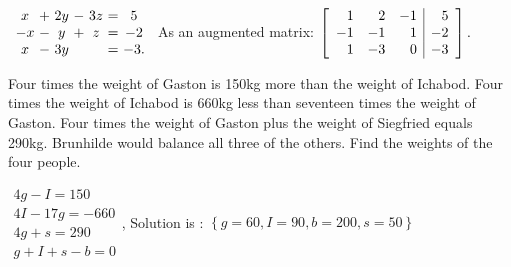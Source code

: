 \begin{enumialphparenastyle}
\begin{ex}
  \begin{sol}
    $
    \begin{array}{c@{~}c@{~}c@{~}c@{~}c@{~}c@{~}c}
      x &+& 2y &-& 3z &=& 5\\
      -x &-& y &+& z &=& -2\\
      x &-& 3y && &=& -3.\\
    \end{array}
    $
    As an augmented matrix:
    $
    \left[
    \begin{array}{rrr|r}
      1 & 2 & -1 & 5\\
      -1 & -1 & 1 & -2\\
      1 & -3 & 0 & -3
    \end{array}
    \right].
    $
  \end{sol}
\end{ex}


\begin{ex}
Four times the weight of Gaston is 150kg more than the weight of
Ichabod. Four times the weight of Ichabod is 660kg less than seventeen
times the weight of Gaston. Four times the weight of Gaston plus the weight
of Siegfried equals 290kg. Brunhilde would balance all three of the
others. Find the weights of the four people.
\begin{sol}
$\begin{array}{c}
4g-I=150 \\
4I-17g=-660 \\
4g+s=290 \\
g+I+s-b=0
\end{array}
$, Solution is : $\left\{ g=60,I=90,b=200,s=50\right\} $
\end{sol}
\end{ex}

\end{enumialphparenastyle}
